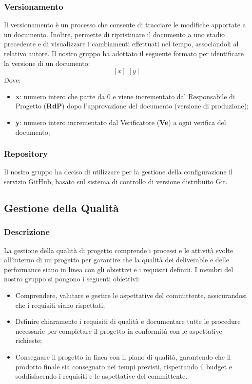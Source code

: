 \subsubsection{Versionamento}
Il versionamento è un processo che consente di tracciare le modifiche apportate a un documento. 
Inoltre, permette di ripristinare il documento a uno stadio precedente e di visualizzare i cambiamenti effettuati nel tempo, 
associandoli al relativo autore.
Il nostro gruppo ha adottato il seguente formato per identificare la versione di un documento:  
\[
[x].[y]
\]
Dove:
\begin{itemize}
    \item \textbf{x}: numero intero che parte da 0 e viene incrementato dal Responsabile di Progetto (\textbf{RdP}) dopo l'approvazione del documento (versione di produzione);
    \item \textbf{y}: numero intero incrementato dal Verificatore (\textbf{Ve}) a ogni verifica del documento;
\end{itemize}

\subsubsection{Repository}
Il nostro gruppo ha deciso di utilizzare per la gestione della configurazione il servizio GitHub, 
basato sul sistema di controllo di versione distribuito Git.








\subsection{Gestione della Qualità}
\subsubsection{Descrizione}
La gestione della qualità di progetto comprende i processi e le attività svolte all’interno di un progetto per garantire 
che la qualità dei deliverable e delle performance siano in linea con gli obiettivi e i requisiti definiti.
I membri del nostro gruppo si pongono i seguenti obiettivi:
\begin{itemize}
    \item Comprendere, valutare e gestire le aspettative del committente, assicurandosi che i requisiti siano rispettati;
    \item Definire chiaramente i requisiti di qualità e documentare tutte le procedure necessarie per completare 
            il progetto in conformità con le aspettative richieste;
    \item Consegnare il progetto in linea con il piano di qualità, garantendo che il prodotto finale sia consegnato 
            nei tempi previsti, rispettando il budget e soddisfacendo i requisiti e le aspettative del committente.
\end{itemize}

